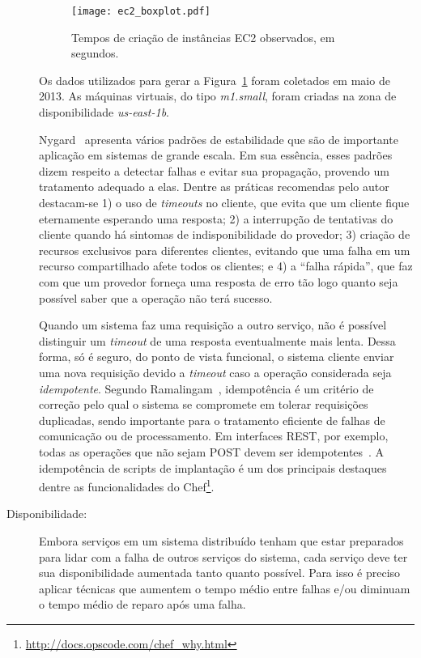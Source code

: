 \begin{description}
\begin{figure}[ht]
\centering
\texttt{[image: ec2\_boxplot.pdf]}
\caption{Tempos de criação de instâncias EC2 observados, em segundos.}
\label{fig:ec2_boxplot}
\end{figure}

Os dados utilizados para gerar a Figura~\ref{fig:ec2_boxplot}
foram coletados em maio de 2013. As máquinas virtuais, 
do tipo \emph{m1.small}, foram criadas na zona de disponibilidade \emph{us-east-1b}.

Nygard~\cite{Nygard2009Release} apresenta vários padrões de estabilidade que são de importante aplicação em sistemas de grande escala. Em sua essência, esses padrões dizem respeito a detectar falhas e evitar sua propagação, provendo um tratamento adequado a elas. Dentre as práticas recomendas pelo autor destacam-se 1) o uso de \emph{timeouts} no cliente, que evita que um cliente fique eternamente esperando uma resposta; 2) a interrupção de tentativas do cliente quando há sintomas de indisponibilidade do provedor; 3) criação de recursos exclusivos para diferentes clientes, evitando que uma falha em um recurso compartilhado afete todos os clientes; e 4) a ``falha rápida'', que faz com que um provedor forneça uma resposta de erro tão logo quanto seja possível saber que a operação não terá sucesso. 

Quando um sistema faz uma requisição a outro serviço, não é possível distinguir um \emph{timeout} de uma resposta eventualmente mais lenta. Dessa forma, só é seguro, do ponto de vista funcional, o sistema cliente enviar uma nova requisição devido a \emph{timeout} caso a operação considerada seja \emph{idempotente}. 
Segundo Ramalingam~\cite{Ramalingam2013Idempotence}, idempotência é um critério de correção pelo qual o sistema se compromete em tolerar requisições duplicadas, sendo importante para o tratamento eficiente de falhas de comunicação ou de processamento.
Em interfaces REST, por exemplo, todas as operações que não sejam POST devem ser idempotentes~\cite{Allamaraju2010REST}. A idempotência de scripts
de implantação é um dos principais destaques dentre as funcionalidades do 
Chef\footnote{\url{http://docs.opscode.com/chef_why.html}}.

\item [Disponibilidade:]

Embora serviços em um sistema distribuído tenham que estar preparados para lidar
com a falha de outros serviços do sistema,
cada serviço deve ter sua disponibilidade aumentada tanto quanto possível. 
Para isso é preciso aplicar técnicas que
aumentem o tempo médio entre falhas e/ou diminuam o tempo médio de reparo após uma falha.


\end{description}
